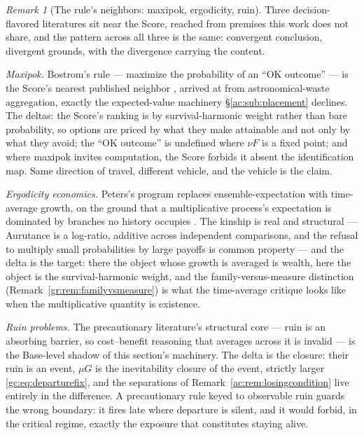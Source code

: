 \documentclass[11pt]{article}
\numberwithin{equation}{section}
\theoremstyle{plain}
\theoremstyle{definition}
\theoremstyle{remark}
\newtheorem{remark}[theorem]{Remark}
\begin{document}
\begin{remark}[The rule's neighbors: maxipok, ergodicity, ruin]
\label{gs:rem:ruleneighbors}
Three decision-flavored literatures sit near the Score, reached from
premises this work does not share, and the pattern across all three is
the same: convergent conclusion, divergent grounds, with the divergence
carrying the content.

\emph{Maxipok.} Bostrom's rule --- maximize the probability of an
``OK outcome'' --- is the Score's nearest published neighbor
\cite{Bos03}, arrived at from astronomical-waste aggregation, exactly
the expected-value machinery \S\ref{ac:sub:placement} declines. The
deltas: the Score's ranking is by survival-harmonic weight rather than
bare probability, so options are priced by what they make attainable
and not only by what they avoid; the ``OK outcome'' is undefined where
$\nu F$ is a fixed point; and where maxipok invites computation, the
Score forbids it absent the identification map. Same direction of
travel, different vehicle, and the vehicle is the claim.

\emph{Ergodicity economics.} Peters's program replaces
ensemble-expectation with time-average growth, on the ground that a
multiplicative process's expectation is dominated by branches no
history occupies \cite{Peters19}. The kinship is real and structural
--- Aurutance is a log-ratio, additive across independent comparisons,
and the refusal to multiply small probabilities by large payoffs is
common property --- and the delta is the target: there the object
whose growth is averaged is wealth, here the object is the
survival-harmonic weight, and the family-versus-measure distinction
(Remark~\ref{gr:rem:familyvsmeasure}) is what the time-average
critique looks like when the multiplicative quantity is existence.

\emph{Ruin problems.} The precautionary literature's structural core
--- ruin is an absorbing barrier, so cost--benefit reasoning that
averages across it is invalid \cite{TRDNB14, Tal12} --- is the
Base-level shadow of this section's machinery. The delta is the
closure: their ruin is an event, $\mu G$ is the inevitability closure
of the event, strictly larger \eqref{gc:eq:departurefix}, and the
separations of Remark~\ref{ac:rem:losingcondition} live entirely in
the difference. A precautionary rule keyed to observable ruin guards
the wrong boundary: it fires late where departure is silent, and it
would forbid, in the critical regime, exactly the exposure that
constitutes staying alive.
\end{remark}
\end{document}
